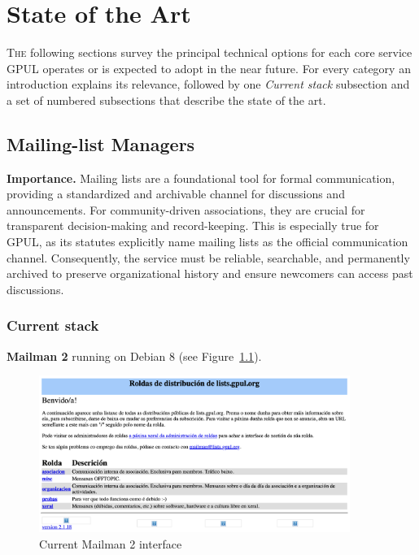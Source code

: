 %

\chapter{State of the Art}
\label{chap:state-of-the-art}

\lettrine{T}{he} following sections survey the principal technical options for each core service GPUL operates or is expected to adopt in the near future.  
For every category an introduction explains its relevance, followed by one \emph{Current stack} subsection and a set of numbered subsections that describe the state of the art.  

\section{Mailing-list Managers}

\textbf{Importance.} Mailing lists are a foundational tool for formal communication, providing a standardized and archivable channel for discussions and announcements. For community-driven associations, they are crucial for transparent decision-making and record-keeping. This is especially true for GPUL, as its statutes explicitly name mailing lists as the official communication channel. Consequently, the service must be reliable, searchable, and permanently archived to preserve organizational history and ensure newcomers can access past discussions.

\subsection*{Current stack}
\textbf{Mailman 2} running on Debian 8 (see Figure~\ref{fig:mailman2}).

\begin{figure}[H]
  \centering
  \includegraphics[width=0.9\textwidth]{imaxes/mailman-2-current.png}
  \caption{Current Mailman 2 interface}
  \label{fig:mailman2}
\end{figure}

